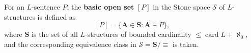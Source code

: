 For an $L$-sentence $P$, the \textbf{basic open set} $[P]$ in the Stone space $\mathcal{S}$ of $L$-structures is defined as
$$[P] = \{ \mathbf{A} \in \mathbf{S} : \mathbf{A} \vDash P \},$$
where $\mathbf{S}$ is the set of all $L$-structures of bounded cardinality $\leq \operatorname{card} L + \aleph_0$, and the corresponding equivalence class in $\mathcal{S} = \mathbf{S}/{\equiv}$ is taken.
